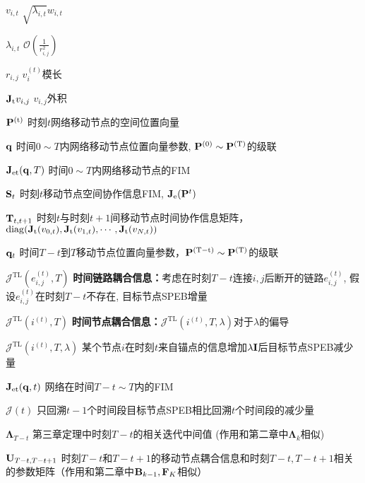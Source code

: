 \documentclass{article}%
\newcommand\V[1]{\mathrm{\bf{#1}}}
\newcommand\Tx[1]{\mathrm{#1}}
\newcommand\Se[1]{\mathcal{#1}}
\begin{document}
\begin{denotation}[3cm]
  \item[$v_{i,t}$] $\sqrt{\lambda_{i,t}}w_{i,t}$
  \item[$\lambda_{i,t}$] $\Se{O}(\frac{1}{r^2_{i,j}})$
  \item[$r_{i,j}$] $v_i^{(t)}$模长
  \item[$\V{J}_{\Tx{t}}v_{i,j}$] $v_{i,j}$外积
  \item[$\V{P}^{(\Tx{t})}$] 时刻$t$网络移动节点的空间位置向量
  \item[$\V{q}$] 时间$0\sim T$内网络移动节点位置向量参数, $\V{P}^{(\Tx{0})}\sim \V{P}^{(\Tx{T})}$的级联
  \item[$\V{J}_{\Tx{et}}(\V{q},T)$] 时间$0\sim T$内网络移动节点的FIM
  \item[$\V{S}_t$] 时刻$t$移动节点空间协作信息FIM, $\V{J}_{\Tx{e}}(\V{P}^{t})$
  \item[$\V{T}_{t,t+1}$] 时刻$t$与时刻$t+1$间移动节点时间协作信息矩阵，$\Tx{diag}(\V{J}_{\Tx{t}}(v_{0,t}),\V{J}_{\Tx{t}}(v_{1,t}),\cdots,\V{J}_{\Tx{t}}(v_{N,t}))$
  \item[$\V{q}_t$] 时间$T-t$到$T$移动节点位置向量参数，$\V{P}^{(\Tx{T-t})}\sim \V{P}^{(\Tx{T})}$的级联
  \item[$\Se{J}^{\Tx{TL}}(e_{i,j}^{(t)},T)$] \textbf{时间链路耦合信息：}考虑在时刻$T-t$连接$i,j$后断开的链路$e_{i,j}^{(t)}$, 假设$e_{i,j}^{(t)}$在时刻$T-t$不存在, 目标节点SPEB增量
  \item[$\Se{J}^{\Tx{TL}}(i^{(t)},T)$] \textbf{时间节点耦合信息：}$\Se{J}^{\Tx{TL}}(i^{(t)},T,\lambda)$对于$\lambda$的偏导
  \item[$\Se{J}^{\Tx{TL}}(i^{(t)},T,\lambda)$] 某个节点$i$在时刻$t$来自锚点的信息增加$\lambda\V{I}$后目标节点SPEB减少量
  \item[$\V{J}_{\Tx{et}}(\V{q},t)$] 网络在时间$T-t\sim T$内的FIM
  \item[$\Se{J}(t)$] 只回溯$t-1$个时间段目标节点SPEB相比回溯$t$个时间段的减少量
  \item[$\bm{\Lambda}_{T-t}$] 第三章定理中时刻$T-t$的相关迭代中间值 (作用和第二章中$\bm{\Lambda}_{k}$相似)
  \item[$\V{U}_{T-t,T-t+1}$] 时刻$T-t$和$T-t+1$的移动节点耦合信息和时刻$T-t,T-t+1$相关的参数矩阵（作用和第二章中$\V{B}_{k-1},\V{F}_K$相似） 
\end{denotation}
\end{document}
